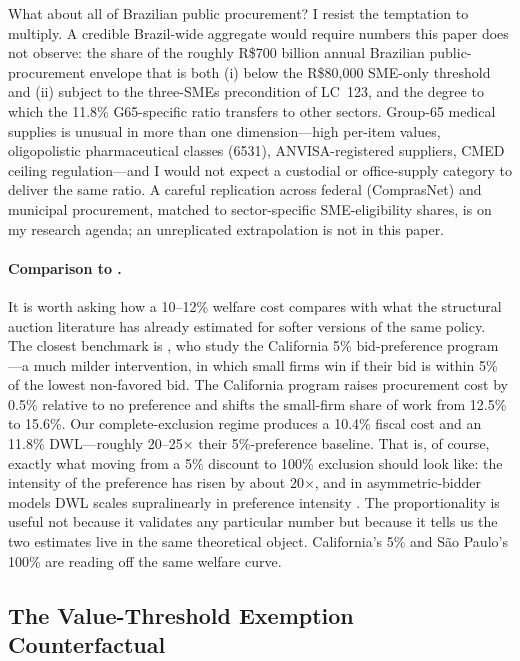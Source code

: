\documentclass[12pt]{article}
\begin{document}
What about all of Brazilian public procurement? I resist the
temptation to multiply. A credible Brazil-wide aggregate would
require numbers this paper does not observe: the share of the
roughly R\$700 billion annual Brazilian public-procurement
envelope that is both (i) below the R\$80{,}000 SME-only threshold
and (ii) subject to the three-SMEs precondition of LC~123, and
the degree to which the 11.8\% G65-specific ratio transfers to
other sectors. Group-65 medical supplies is unusual in more
than one dimension---high per-item values, oligopolistic
pharmaceutical classes (6531), ANVISA-registered suppliers,
CMED ceiling regulation---and I would not expect a custodial or
office-supply category to deliver the same ratio. A careful
replication across federal (ComprasNet) and municipal procurement,
matched to sector-specific SME-eligibility shares, is on my
research agenda; an unreplicated extrapolation is not in this
paper.

\paragraph{Comparison to \citet{krasnokutskayaseim2011}.}
It is worth asking how a 10--12\% welfare cost compares with what
the structural auction literature has already estimated for softer
versions of the same policy. The closest benchmark is
\citet{krasnokutskayaseim2011}, who study the California 5\%
bid-preference program---a much milder intervention, in which
small firms win if their bid is within 5\% of the lowest
non-favored bid. The California program raises procurement cost
by 0.5\% relative to no preference and shifts the small-firm
share of work from 12.5\% to 15.6\%. Our complete-exclusion regime
produces a 10.4\% fiscal cost and an 11.8\% DWL---roughly
20--25$\times$ their 5\%-preference baseline. That is, of course,
exactly what moving from a 5\% discount to 100\% exclusion should
look like: the intensity of the preference has risen by about
20$\times$, and in asymmetric-bidder models DWL scales
supralinearly in preference intensity \citep[see][Section
IV]{krasnokutskayaseim2011}. The proportionality is useful not
because it validates any particular number but because it tells
us the two estimates live in the same theoretical object. California's
5\% and São Paulo's 100\% are reading off the same welfare curve.

\subsection{The Value-Threshold Exemption Counterfactual}
\label{sec:welfare-vt}
\end{document}
